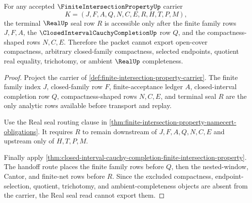 \begin{theorem}
\label{thm:finite-intersection-property-real-seal-nesting}
For any accepted $\FiniteIntersectionPropertyUp$ carrier
$$
K=(J,F,A,Q,N,C,E,R,H,T,P,M),
$$
the terminal $\RealUp$ seal row $R$ is accessible only after the finite family rows $J,F,A$, the $\ClosedIntervalCauchyCompletionUp$ row $Q$, and the compactness-shaped rows $N,C,E$. Therefore the packet cannot export open-cover compactness, arbitrary closed-family compactness, selected endpoints, quotient real equality, trichotomy, or ambient $\RealUp$ completeness.
\end{theorem}
\begin{proof}
Project the carrier of \autoref{def:finite-intersection-property-carrier}. The finite family index $J$, closed-family row $F$, finite-acceptance ledger $A$, closed-interval completion row $Q$, compactness-shaped rows $N,C,E$, and terminal seal $R$ are the only analytic rows available before transport and replay.

Use the Real seal routing clause in \autoref{thm:finite-intersection-property-namecert-obligations}. It requires $R$ to remain downstream of $J,F,A,Q,N,C,E$ and upstream only of $H,T,P,M$.

Finally apply \autoref{thm:closed-interval-cauchy-completion-finite-intersection-property}. The handoff route places the finite family rows before $Q$, then the nested-window, Cantor, and finite-net rows before $R$. Since the excluded compactness, endpoint-selection, quotient, trichotomy, and ambient-completeness objects are absent from the carrier, the Real seal read cannot export them.
\end{proof}

